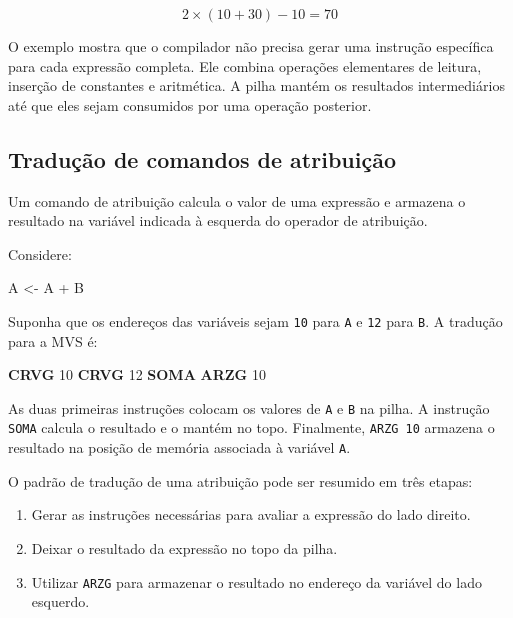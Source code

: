 \documentclass[
  brazilian,
  letterpaper,
]{book}
\newenvironment{Shaded}{\begin{snugshade}}{\end{snugshade}}
\newcommand{\DecValTok}[1]{\textcolor[rgb]{0.68,0.00,0.00}{#1}}
\newcommand{\KeywordTok}[1]{\textcolor[rgb]{0.00,0.23,0.31}{\textbf{#1}}}
\newcommand{\NormalTok}[1]{\textcolor[rgb]{0.00,0.23,0.31}{#1}}
\providecommand{\tightlist}{%
  \setlength{\itemsep}{0pt}\setlength{\parskip}{0pt}}
\theoremstyle{plain}
\theoremstyle{definition}
\theoremstyle{remark}
\begin{document}
\[
2 \times (10+30)-10 = 70
\]

O exemplo mostra que o compilador não precisa gerar uma instrução
específica para cada expressão completa. Ele combina operações
elementares de leitura, inserção de constantes e aritmética. A pilha
mantém os resultados intermediários até que eles sejam consumidos por
uma operação posterior.

\subsection{Tradução de comandos de
atribuição}\label{traduuxe7uxe3o-de-comandos-de-atribuiuxe7uxe3o}

Um comando de atribuição calcula o valor de uma expressão e armazena o
resultado na variável indicada à esquerda do operador de atribuição.

Considere:

\begin{Shaded}
\begin{Highlighting}[]
\NormalTok{A \textless{}{-} A + B}
\end{Highlighting}
\end{Shaded}

Suponha que os endereços das variáveis sejam \texttt{10} para \texttt{A}
e \texttt{12} para \texttt{B}. A tradução para a MVS é:

\begin{Shaded}
\begin{Highlighting}[]
\KeywordTok{CRVG}  \DecValTok{10}
\KeywordTok{CRVG}  \DecValTok{12}
\KeywordTok{SOMA}
\KeywordTok{ARZG}  \DecValTok{10}
\end{Highlighting}
\end{Shaded}

As duas primeiras instruções colocam os valores de \texttt{A} e
\texttt{B} na pilha. A instrução \texttt{SOMA} calcula o resultado e o
mantém no topo. Finalmente, \texttt{ARZG\ 10} armazena o resultado na
posição de memória associada à variável \texttt{A}.

O padrão de tradução de uma atribuição pode ser resumido em três etapas:

\begin{enumerate}
\def\labelenumi{\arabic{enumi}.}
\tightlist
\item
  Gerar as instruções necessárias para avaliar a expressão do lado
  direito.
\item
  Deixar o resultado da expressão no topo da pilha.
\item
  Utilizar \texttt{ARZG} para armazenar o resultado no endereço da
  variável do lado esquerdo.
\end{enumerate}
\end{document}
